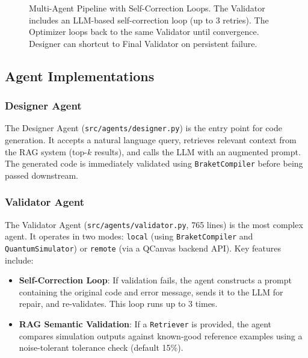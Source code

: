 \documentclass[runningheads]{llncs}
\begin{document}
\begin{figure}[H]
    \caption{Multi-Agent Pipeline with Self-Correction Loops. The Validator includes an LLM-based self-correction loop (up to 3 retries). The Optimizer loops back to the same Validator until convergence. Designer can shortcut to Final Validator on persistent failure.}
    \label{fig:arch}
\end{figure}

\subsection{Agent Implementations}
\subsubsection{Designer Agent}
The Designer Agent (\texttt{src/agents/designer.py}) is the entry point for code generation. It accepts a natural language query, retrieves relevant context from the RAG system (top-$k$ results), and calls the LLM with an augmented prompt. The generated code is immediately validated using \texttt{BraketCompiler} before being passed downstream.

\subsubsection{Validator Agent}
The Validator Agent (\texttt{src/agents/validator.py}, 765 lines) is the most complex agent. It operates in two modes: \texttt{local} (using \texttt{BraketCompiler} and \texttt{QuantumSimulator}) or \texttt{remote} (via a QCanvas backend API). Key features include:
\begin{itemize}
    \item \textbf{Self-Correction Loop}: If validation fails, the agent constructs a prompt containing the original code and error message, sends it to the LLM for repair, and re-validates. This loop runs up to 3 times.
    \item \textbf{RAG Semantic Validation}: If a \texttt{Retriever} is provided, the agent compares simulation outputs against known-good reference examples using a noise-tolerant tolerance check (default 15\%).
\end{itemize}
\end{document}
